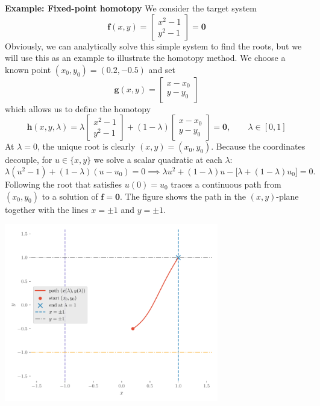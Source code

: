 \begin{exampleBox}
    \textbf{Example: Fixed-point homotopy}
    We consider the target system
    \[
    \mathbf f(x,y)=
    \begin{bmatrix}
    x^2-1\\
    y^2-1
    \end{bmatrix}=\mathbf 0
    \]
    Obviously, we can analytically solve this simple system to find the roots, but we will use this as an example to illustrate the homotopy method. We choose a known point \((x_0,y_0)=(0.2,-0.5)\) and set
    \[
    \mathbf g(x,y)=
    \begin{bmatrix}
    x-x_0\\
    y-y_0
    \end{bmatrix}
    \]
    which allows us to define the homotopy
    \[
    \mathbf h(x,y,\lambda)
    =\lambda
    \begin{bmatrix}
    x^2-1\\ y^2-1
    \end{bmatrix}
    +(1-\lambda)
    \begin{bmatrix}
    x-x_0\\ y-y_0
    \end{bmatrix}
    =\mathbf 0,\qquad \lambda\in[0,1]
    \]
    At \(\lambda=0\), the unique root is clearly \((x,y)=(x_0,y_0)\). Because the coordinates decouple, for \(u\in\{x,y\}\) we solve a scalar quadratic at each \(\lambda\):
    \[
    \lambda(u^2-1)+(1-\lambda)(u-u_0)=0
    \implies
    \lambda u^2+(1-\lambda)u-\big[\lambda+(1-\lambda)u_0\big]=0.
    \]
    Following the root that satisfies \(u(0)=u_0\) traces a continuous path from \((x_0,y_0)\) to a solution of \(\mathbf f=\mathbf 0\).
    The figure shows the path in the \((x,y)\)-plane together with the lines \(x=\pm1\) and \(y=\pm1\).

    \begin{center}
        \includegraphics[width=0.7\textwidth]{figs/nle/fixed_point_path.pdf}
    \end{center}

\end{exampleBox}

